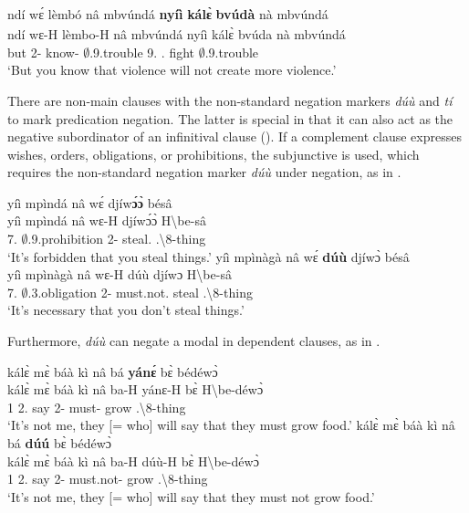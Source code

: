 \documentclass[output=paper,colorlinks=true, citecolor=brown,draftmode]{langscibook}
\begin{document}
\ea\label{COMP3x} 
  \glll ndí wɛ́ lèmbó {\ob}nâ mbvúndá {\bfseries nyíì} {\bfseries kálɛ̀} {\bfseries bvúdà} nà mbvúndá{\cb}\textsubscript{{\COMP}}\\
        ndí wɛ-H lèmbo-H {\db}nâ mbvúndá nyíì kálɛ̀ bvúda nà mbvúndá\\
         but 2{\SG}-{\PRS} know-{\R} {\db}{\COMP} $\emptyset$.9.trouble 9.{\FUT} {\NEG}.{\FUT} fight {\COM} $\emptyset$.9.trouble\\
    \trans `But you know that violence will not create more violence.'
\z

There are non-main clauses with the non-standard negation markers {\itshape dúù} and {\itshape tí} to mark predication negation. The latter is special in that it can also act as the negative subordinator of an infinitival clause ().  If a complement clause expresses wishes, orders, obligations, or prohibitions, the subjunctive is used, which requires the non-standard negation marker {\itshape dúù} under negation, as in .

\ea\label{SBJV}
\ea\label{SBJV1}
  \glll  yíì mpìndá nâ wɛ́ djíw{\bfseries ɔ́ɔ̀} bésâ \\
          yíì mpìndá nâ wɛ-H djíwɔ́ɔ̀ {H\backslash{}be-sâ}\\
              7.{\COP} $\emptyset$.9.prohibition {\COMP} 2{\SG}-{\PRS} steal.{\SBJV} {{\OBJ}.{\LINK}\backslash{}8-thing}\\
    \trans `It's forbidden that you steal things.'
\ex\label{SBJV2}
  \glll  yíì mpìnàgà nâ wɛ́ {\bfseries dúù} djíwɔ̀ bésâ\\
          yíì mpìnàgà nâ wɛ-H dúù djíwɔ {H\backslash{}be-sâ}\\
              7.{\COP} $\emptyset$.3.obligation {\COMP} 2{\SG}-{\PRS} must.not.{\SBJV} steal {{\OBJ}.{\LINK}\backslash{}8-thing}\\
    \trans `It's necessary that you don't steal things.'    
\z
\z

Furthermore, {\itshape dúù} can negate a modal in dependent clauses, as in .

\ea\label{SBJVx}
\ea\label{SBJVxa}
  \glll kálɛ̀ mɛ̀ báà kì nâ bá {\bfseries yánɛ́} bɛ̀ bédéwɔ̀ \\
         kálɛ̀ mɛ̀ báà kì nâ ba-H yánɛ-H bɛ̀ H\backslash{}be-déwɔ̀ \\
      {\NEG} 1{\SG}  2.{\FUT} say {\COMP} 2-{\PRS} must-{\R} grow {{\OBJ}.{\LINK}\backslash{}8-thing} \\
    \trans `It's not me, they [= who] will say that they must grow food.'
\ex\label{SBJVxb}
  \glll kálɛ̀ mɛ̀ báà kì nâ bá {\bfseries dúú} bɛ̀ bédéwɔ̀ \\
         kálɛ̀ mɛ̀ báà kì nâ ba-H dúù-H bɛ̀ H\backslash{}be-déwɔ̀ \\
      {\NEG} 1{\SG}  2.{\FUT} say {\COMP} 2-{\PRS} must.not-{\R} grow {{\OBJ}.{\LINK}\backslash{}8-thing} \\
    \trans `It's not me, they [= who] will say that they must not grow food.'
\z
\z
\end{document}
